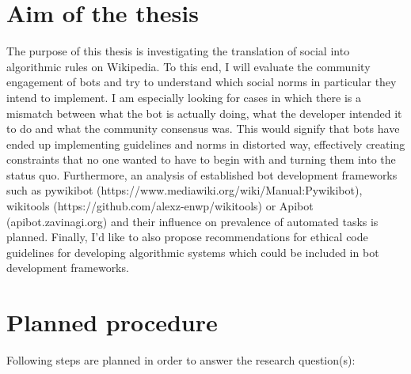 \documentclass[pdftex,a4paper,11pt]{scrartcl}
\begin{document}
\section{Aim of the thesis}
The purpose of this thesis is investigating the translation of social into algorithmic rules on Wikipedia.
To this end, I will evaluate the community engagement of bots and try to understand which social norms in particular they intend to implement.
I am especially looking for cases in which there is a mismatch between what the bot is actually doing, what the developer intended it to do and what the community consensus was.
This would signify that bots have ended up implementing guidelines and norms in distorted way, effectively creating constraints that no one wanted to have to begin with and turning them into the status quo.
Furthermore, an analysis of established bot development frameworks such as pywikibot (https://www.mediawiki.org/wiki/Manual:Pywikibot), wikitools (https://github.com/alexz-enwp/wikitools) or Apibot (apibot.zavinagi.org) and their influence on prevalence of automated tasks is planned.
Finally, I'd like to also propose recommendations for ethical code guidelines for developing algorithmic systems which could be included in bot development frameworks.

\section{Planned procedure}

Following steps are planned in order to answer the research question(s):
\end{document}
